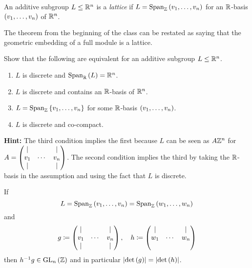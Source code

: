 \documentclass[11pt]{article}
\begin{document}
\begin{definition}
An additive subgroup $L \leq \mathbb{R}^n$ is a \emph{lattice} if $L = \operatorname{Span}_{\mathbb{Z}}\left( v_1, \ldots, v_n \right)$ for an $\mathbb{R}$-basis $\left( v_1, \ldots, v_n \right)$ of $\mathbb{R}^n$.
\end{definition}

\begin{remark}
The theorem from the beginning of the class
can be restated as saying that the geometric embedding of a full module is a lattice.
\end{remark}

\begin{exercise}
Show that the following are equivalent for an additive subgroup $L \leq \mathbb{R}^n$.

\begin{enumerate}
\item $L$ is discrete and $\operatorname{Span}_{\mathbb{R}}\left( L \right) = \mathbb{R}^n$.

\item $L$ is discrete and contains an $\mathbb{R}$-basis of $\mathbb{R}^n$.

\item $L = \Span_{\mbb{Z}}\set{v_1, \ldots, v_n}$ for some $\mathbb{R}$-basis $\left( v_1, \ldots, v_n \right)$.

\item $L$ is discrete and co-compact.
\end{enumerate}

\textbf{Hint:} The third condition implies the first because $L$ can be seen as $A \mathbb{Z}^n$ for $A = \begin{pmatrix}\vert & & \vert \\ v_1 & \cdots & v_n \\ \vert & & \vert\end{pmatrix}$.
The second condition implies the third by taking the $\mathbb{R}$-basis in the assumption and using the fact that $L$ is discrete. 
\end{exercise}

\begin{proposition}
If \[L = \operatorname{Span}_{\mathbb{Z}}\left( v_1, \ldots, v_n \right) = \operatorname{Span}_{\mathbb{Z}}\left( w_1, \ldots, w_n \right)\]
and
\begin{align*}
g \coloneqq \begin{pmatrix}\vert & & \vert \\ v_1 & \cdots & v_n \\ \vert & &  \vert\end{pmatrix} ,\quad h \coloneqq \begin{pmatrix}\vert & & \vert \\ w_1 & \cdots & w_n \\ & &\end{pmatrix}
\end{align*}
then $h^{-1} g \in \mathrm{GL}_n\left( \mathbb{Z} \right)$ and in particular $\left| \det\left( g \right) \right| = \left| \det\left( h \right) \right|$.
\end{proposition}
\end{document}
